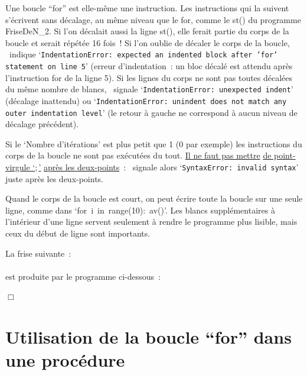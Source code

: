 Une boucle ``for'' est elle-même une instruction. Les instructions qui la suivent
s'écrivent sans décalage, au même niveau que le {\mcl for}, comme le {\idt st()} du
programme {\idt FriseDeN\_2}. Si l'on décalait aussi la ligne {\idt st()}, elle ferait partie
du corps de la boucle et serait répétée 16 fois~! Si l'on oublie de décaler le corps
de la boucle, \python\ indique
`{\tt IndentationError: expected an indented block after 'for' statement on line 5}'
(erreur d'indentation~: un bloc décalé est attendu après l'instruction {\mcl for} de la
ligne 5). Si les lignes du corps ne sont pas toutes décalées du même nombre de blancs,
\python\ signale `{\tt IndentationError: unexpected indent}' (décalage inattendu) ou
`{\tt IndentationError: unindent does not match any outer indentation level}'
(le retour à gauche ne correspond à aucun niveau de décalage précédent).

Si le `Nombre d'itérations' est plus petit que 1 (0 par exemple)  les instructions du
corps de la boucle ne sont pas exécutées du tout. \underline{Il ne faut pas mettre} \underline{de point-virgule `{\idt $;$}'} \underline{après les deux-points}~: \python\ signale alors `{\tt SyntaxError: invalid syntax}' juste après les deux-points.

Quand le corps de la boucle est court, on peut écrire toute la boucle sur une seule
ligne, comme dans `{\mcl for}\ {\idt i\ }{\mcl in}\ {\idt range(10):\ av()}'.
Les blancs supplémentaires à l'intérieur d'une ligne servent seulement à rendre le
programme plus lisible, mais ceux du début de ligne sont importants.

\begin{exemple}{\rm
 La frise suivante~:\\[20mm]
%
\\[1ex]
est produite par le programme ci-dessous~:

\noindent $\Box$}
\end{exemple}

\section{Utilisation de la boucle ``for'' dans une procédure}

